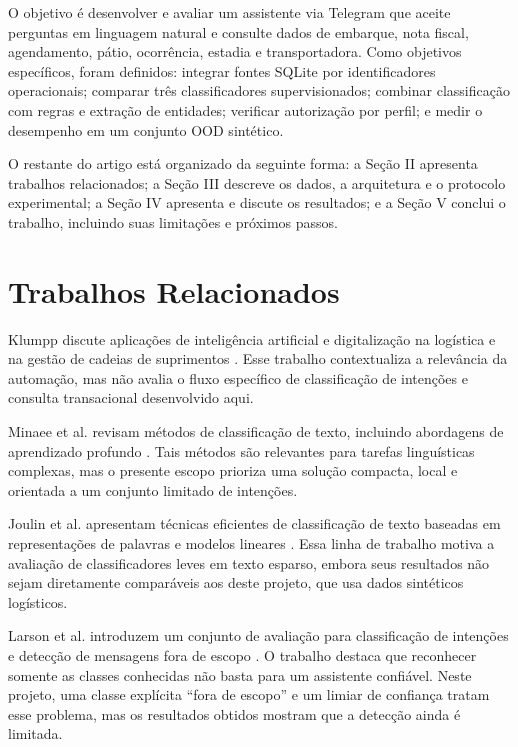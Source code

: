 \documentclass[conference]{IEEEtran}
\begin{document}
O objetivo é desenvolver e avaliar um assistente via Telegram que aceite perguntas em linguagem natural e consulte dados de embarque, nota fiscal, agendamento, pátio, ocorrência, estadia e transportadora. Como objetivos específicos, foram definidos: integrar fontes SQLite por identificadores operacionais; comparar três classificadores supervisionados; combinar classificação com regras e extração de entidades; verificar autorização por perfil; e medir o desempenho em um conjunto OOD sintético.

O restante do artigo está organizado da seguinte forma: a Seção II apresenta trabalhos relacionados; a Seção III descreve os dados, a arquitetura e o protocolo experimental; a Seção IV apresenta e discute os resultados; e a Seção V conclui o trabalho, incluindo suas limitações e próximos passos.

\section{Trabalhos Relacionados}

Klumpp discute aplicações de inteligência artificial e digitalização na logística e na gestão de cadeias de suprimentos \cite{klumpp}. Esse trabalho contextualiza a relevância da automação, mas não avalia o fluxo específico de classificação de intenções e consulta transacional desenvolvido aqui.

Minaee et al. revisam métodos de classificação de texto, incluindo abordagens de aprendizado profundo \cite{minaee}. Tais métodos são relevantes para tarefas linguísticas complexas, mas o presente escopo prioriza uma solução compacta, local e orientada a um conjunto limitado de intenções.

Joulin et al. apresentam técnicas eficientes de classificação de texto baseadas em representações de palavras e modelos lineares \cite{joulin}. Essa linha de trabalho motiva a avaliação de classificadores leves em texto esparso, embora seus resultados não sejam diretamente comparáveis aos deste projeto, que usa dados sintéticos logísticos.

Larson et al. introduzem um conjunto de avaliação para classificação de intenções e detecção de mensagens fora de escopo \cite{larson}. O trabalho destaca que reconhecer somente as classes conhecidas não basta para um assistente confiável. Neste projeto, uma classe explícita ``fora de escopo'' e um limiar de confiança tratam esse problema, mas os resultados obtidos mostram que a detecção ainda é limitada.
\end{document}
